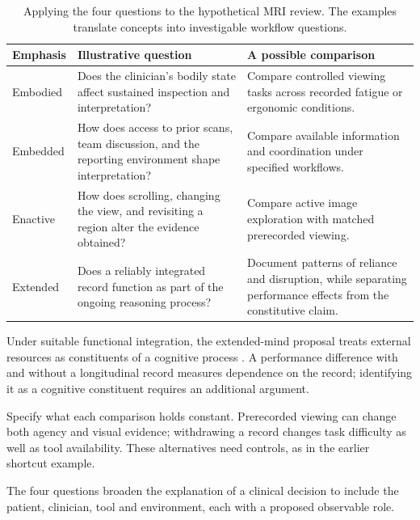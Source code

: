 \begin{table}[htbp]\centering\small
\caption{Applying the four questions to the hypothetical MRI review. The examples translate concepts into investigable workflow questions.}
\begin{tabularx}{\linewidth}{p{21mm}XX}\toprule
Emphasis & Illustrative question & A possible comparison \\\midrule
Embodied & Does the clinician's bodily state affect sustained inspection and interpretation? & Compare controlled viewing tasks across recorded fatigue or ergonomic conditions.\\
Embedded & How does access to prior scans, team discussion, and the reporting environment shape interpretation? & Compare available information and coordination under specified workflows.\\
Enactive & How does scrolling, changing the view, and revisiting a region alter the evidence obtained? & Compare active image exploration with matched prerecorded viewing.\\
Extended & Does a reliably integrated record function as part of the ongoing reasoning process? & Document patterns of reliance and disruption, while separating performance effects from the constitutive claim.\\\bottomrule
\end{tabularx}
\end{table}

Under suitable functional integration, the extended-mind proposal treats external resources as constituents of a cognitive process \citep{clark1998}. A performance difference with and without a longitudinal record measures dependence on the record; identifying it as a cognitive constituent requires an additional argument.

Specify what each comparison holds constant. Prerecorded viewing can change both agency and visual evidence; withdrawing a record changes task difficulty as well as tool availability. These alternatives need controls, as in the earlier shortcut example.

The four questions broaden the explanation of a clinical decision to include the patient, clinician, tool and environment, each with a proposed observable role.

